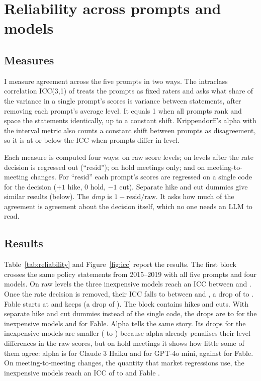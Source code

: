 \section{Reliability across prompts and models}\label{sec:reliability}

\subsection{Measures}

I measure agreement across the five prompts in two ways. The intraclass correlation ICC(3,1) of
\citet{shrout1979} treats the prompts as fixed raters and asks what share of the variance in a single
prompt's scores is variance between statements, after removing each prompt's average level. It equals 1
when all prompts rank and space the statements identically, up to a constant shift. Krippendorff's alpha
with the interval metric \citep{hayes2007,krippendorff2018} also counts a constant shift between prompts
as disagreement, so it is at or below the ICC when prompts differ in level.

Each measure is computed four ways: on raw score levels; on levels after the rate decision is regressed
out (``resid''); on hold meetings only; and on meeting-to-meeting changes. For ``resid'' each prompt's
scores are regressed on a single code for the decision ($+1$ hike, $0$ hold, $-1$ cut). Separate hike
and cut dummies give similar results (below).
The \emph{drop} is $1-\text{resid}/\text{raw}$. It asks how much of the agreement is agreement about the
decision itself, which no one needs an LLM to read.

\subsection{Results}

Table~\ref{tab:reliability} and Figure~\ref{fig:icc} report the results. The first block crosses the same
 policy statements from 2015--2019 with all five prompts and four models. On raw levels
the three inexpensive models reach an ICC between  and . Once the rate
decision is removed, their ICC falls to between  and , a drop of
 to . Fable starts at  and keeps 
(a drop of ). The block contains  hikes and  cuts. With
separate hike and cut dummies instead of the single code, the drops are  to
 for the inexpensive models and  for Fable. Alpha tells the same
story. Its drops for the inexpensive models are
smaller ( to ) because alpha already penalises their level
differences in the raw scores, but on hold meetings it shows how little some of them agree: alpha is
 for Claude 3 Haiku and  for GPT-4o mini, against
 for Fable. On meeting-to-meeting changes, the quantity that market regressions use,
the inexpensive models reach an ICC of  to  and Fable .

